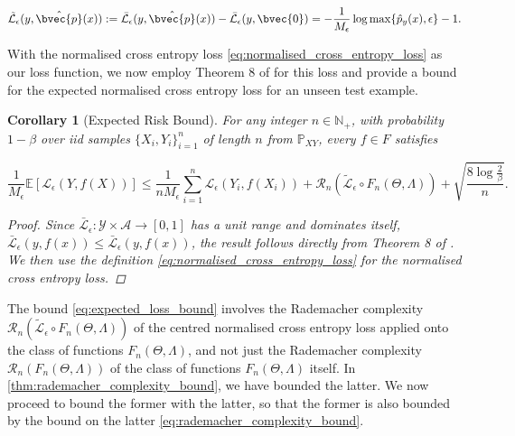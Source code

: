 \documentclass{article}
\newtheorem{corollary}[theorem]{Corollary}
\begin{document}
		\begin{equation}
			\tilde{\mathcal{L}}_{\epsilon}(y, \hat{\bvec{p}}(x)) := \bar{\mathcal{L}}_{\epsilon}(y, \hat{\bvec{p}}(x)) - \bar{\mathcal{L}}_{\epsilon}(y, \bvec{0}) = - \frac{1}{M_{\epsilon}} \log{\max \{ \hat{p}_{y}(x), \epsilon \}} - 1.
		\label{eq:centred_normalised_cross_entropy_loss}
		\end{equation}
		
		With the normalised cross entropy loss \eqref{eq:normalised_cross_entropy_loss} as our loss function, we now employ Theorem 8 of \cite{bartlett2002rademacher} for this loss and provide a bound for the expected normalised cross entropy loss for an unseen test example.
		
		\begin{corollary}[Expected Risk Bound]
		\label{thm:expected_normalised_cross_entropy_loss_bound}
			For any integer $n \in \mathbb{N}_{+}$, with probability $1 - \beta$ over \textit{iid} samples $\{X_{i}, Y_{i}\}_{i = 1}^{n}$ of length $n$ from $\mathbb{P}_{X Y}$, every $f \in F$ satisfies
			
			\begin{equation}
				\frac{1}{M_{\epsilon}} \mathbb{E}[\mathcal{L}_{\epsilon}(Y, f(X))] \leq \frac{1}{n M_{\epsilon}} \sum_{i = 1}^{n} \mathcal{L}_{\epsilon}(Y_{i}, f(X_{i})) + \mathcal{R}_{n}(\tilde{\mathcal{L}}_{\epsilon} \circ F_{n}(\Theta, \Lambda)) + \sqrt{\frac{8 \log{\frac{2}{\beta}}}{n}}.
			\label{eq:expected_loss_bound}
			\end{equation}
			
			\begin{proof}
				Since $\bar{\mathcal{L}}_{\epsilon} : \mathcal{Y} \times \mathcal{A} \to [0, 1]$ has a unit range and dominates itself, $\bar{\mathcal{L}}_{\epsilon}(y, f(x)) \leq \bar{\mathcal{L}}_{\epsilon}(y, f(x))$, the result follows directly from Theorem 8 of \cite{bartlett2002rademacher}. We then use the definition \eqref{eq:normalised_cross_entropy_loss} for the normalised cross entropy loss.
			\end{proof}
		\end{corollary}
		
		The bound \eqref{eq:expected_loss_bound} involves the Rademacher complexity $\mathcal{R}_{n}(\tilde{\mathcal{L}}_{\epsilon} \circ F_{n}(\Theta, \Lambda))$ of the centred normalised cross entropy loss applied onto the class of functions $F_{n}(\Theta, \Lambda)$, and not just the Rademacher complexity $\mathcal{R}_{n}(F_{n}(\Theta, \Lambda))$ of the class of functions $F_{n}(\Theta, \Lambda)$ itself. In \cref{thm:rademacher_complexity_bound}, we have bounded the latter. We now proceed to bound the former with the latter, so that the former is also bounded by the bound on the latter \eqref{eq:rademacher_complexity_bound}.
		
\end{document}

